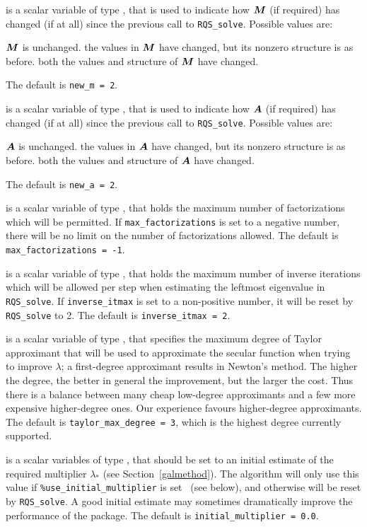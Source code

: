 \documentclass{galahad}
\newcommand{\packagename}{RQS}
\begin{document}
\begin{description}
 is a scalar variable of type \integer, that is used
to indicate how ${\bm{M}}$ (if required) has changed (if at all) since the previous
call to {\tt \packagename\_solve}. Possible values are:
\begin{description}
 ${\bm{M}}$ is unchanged.
 the values in ${\bm{M}}$ have changed, but its nonzero structure
is as before.
 both the values and structure of ${\bm{M}}$ have changed.
\end{description}
The default is {\tt new\_m = 2}.

 is a scalar variable of type \integer, that is used
to indicate how ${\bm{A}}$ (if required) has changed (if at all) since the previous
call to {\tt \packagename\_solve}. Possible values are:
\begin{description}
 ${\bm{A}}$ is unchanged.
 the values in ${\bm{A}}$ have changed, but its nonzero structure
is as before.
 both the values and structure of ${\bm{A}}$ have changed.
\end{description}
The default is {\tt new\_a = 2}.

 is a scalar variable of type \integer,
that holds the maximum number of factorizations which will be permitted.
If {\tt max\_factorizations} is set to a negative number, there will be
no limit on the number of factorizations allowed.
The default is {\tt max\_factorizations = -1}.

 is a scalar variable of type \integer, that holds
the maximum number of inverse iterations which will be allowed per step
when estimating the leftmost eigenvalue in {\tt \packagename\_solve}.
If {\tt inverse\_itmax} is set to a non-positive number, it will be reset by
{\tt \packagename\_solve} to 2.
The default is {\tt inverse\_itmax = 2}.

 is a scalar variable of type \integer,
that specifies the maximum degree of Taylor approximant that will be used
to approximate the secular function when trying to improve $\lambda$;
a first-degree approximant results in Newton's method.
The higher the degree, the better in general the improvement, but the larger the
cost. Thus there is a balance between many cheap low-degree approximants
and a few more expensive higher-degree ones. Our experience favours
higher-degree approximants.
The default is {\tt taylor\_max\_degree = 3}, which is the highest degree
currently supported.

 is a scalar variables of type \realdp, that should
be set to an initial estimate of the required multiplier $\lambda_*$
(see Section~\ref{galmethod}). The algorithm will only use this value
if {\tt \%use\_initial\_multiplier} is set \true\ (see below), and otherwise
will be reset by {\tt \packagename\_solve}. A good initial estimate
may sometimes dramatically improve the performance of the package.
The default is {\tt initial\_multiplier = 0.0}.


\end{description}
\end{document}
